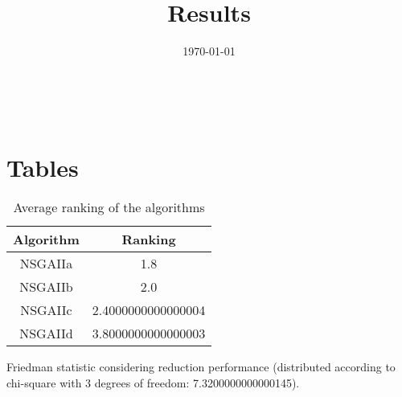 \documentclass{article}
\title{Results}
\author{}
\date{\today}
\begin{document}
\oddsidemargin 0in \topmargin 0in\maketitle
\
\section{Tables}
\begin{table}[!htp]
\centering
\caption{Average ranking of the algorithms}
\begin{tabular}{c|c}
Algorithm&Ranking\\
\hline
NSGAIIa&1.8\\
NSGAIIb&2.0\\
NSGAIIc&2.4000000000000004\\
NSGAIId&3.8000000000000003\\
\end{tabular}
\end{table}


Friedman statistic considering reduction performance (distributed according to chi-square with 3 degrees of freedom: 7.3200000000000145).
\end{document}
